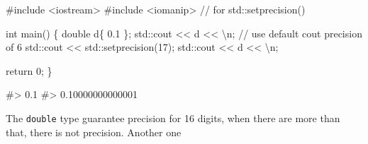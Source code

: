 \documentclass[
  letterpaper,
  DIV=11,
  numbers=noendperiod]{scrreprt}
\newenvironment{Shaded}{\begin{snugshade}}{\end{snugshade}}
\newcommand{\CommentTok}[1]{\textcolor[rgb]{0.37,0.37,0.37}{#1}}
\newcommand{\DecValTok}[1]{\textcolor[rgb]{0.68,0.00,0.00}{#1}}
\newcommand{\ErrorTok}[1]{\textcolor[rgb]{0.68,0.00,0.00}{#1}}
\newcommand{\FloatTok}[1]{\textcolor[rgb]{0.68,0.00,0.00}{#1}}
\newcommand{\FunctionTok}[1]{\textcolor[rgb]{0.28,0.35,0.67}{#1}}
\newcommand{\NormalTok}[1]{\textcolor[rgb]{0.00,0.23,0.31}{#1}}
\newcommand{\SpecialCharTok}[1]{\textcolor[rgb]{0.37,0.37,0.37}{#1}}
\newcommand{\StringTok}[1]{\textcolor[rgb]{0.13,0.47,0.30}{#1}}
\begin{document}
\begin{Shaded}
\begin{Highlighting}[]
\CommentTok{\#include \textless{}iostream\textgreater{}}
\CommentTok{\#include \textless{}iomanip\textgreater{}      // for std::setprecision()}

\NormalTok{int }\FunctionTok{main}\NormalTok{()}
\NormalTok{\{}
\NormalTok{    double d\{ }\FloatTok{0.1}\NormalTok{ \};}
\NormalTok{    std}\SpecialCharTok{::}\NormalTok{cout }\SpecialCharTok{\textless{}}\ErrorTok{\textless{}}\NormalTok{ d }\SpecialCharTok{\textless{}}\ErrorTok{\textless{}} \StringTok{\textquotesingle{}}\SpecialCharTok{\textbackslash{}n}\StringTok{\textquotesingle{}}\NormalTok{; }\SpecialCharTok{/}\ErrorTok{/}\NormalTok{ use default cout precision of }\DecValTok{6}
\NormalTok{    std}\SpecialCharTok{::}\NormalTok{cout }\SpecialCharTok{\textless{}}\ErrorTok{\textless{}}\NormalTok{ std}\SpecialCharTok{::}\FunctionTok{setprecision}\NormalTok{(}\DecValTok{17}\NormalTok{);}
\NormalTok{    std}\SpecialCharTok{::}\NormalTok{cout }\SpecialCharTok{\textless{}}\ErrorTok{\textless{}}\NormalTok{ d }\SpecialCharTok{\textless{}}\ErrorTok{\textless{}} \StringTok{\textquotesingle{}}\SpecialCharTok{\textbackslash{}n}\StringTok{\textquotesingle{}}\NormalTok{;}

\NormalTok{    return }\DecValTok{0}\NormalTok{;}
\NormalTok{\}}

\CommentTok{\#\textgreater{} 0.1}
\CommentTok{\#\textgreater{} 0.10000000000001}
\end{Highlighting}
\end{Shaded}

The \texttt{double} type guarantee precision for 16 digits, when there
are more than that, there is not precision. Another one
\end{document}
